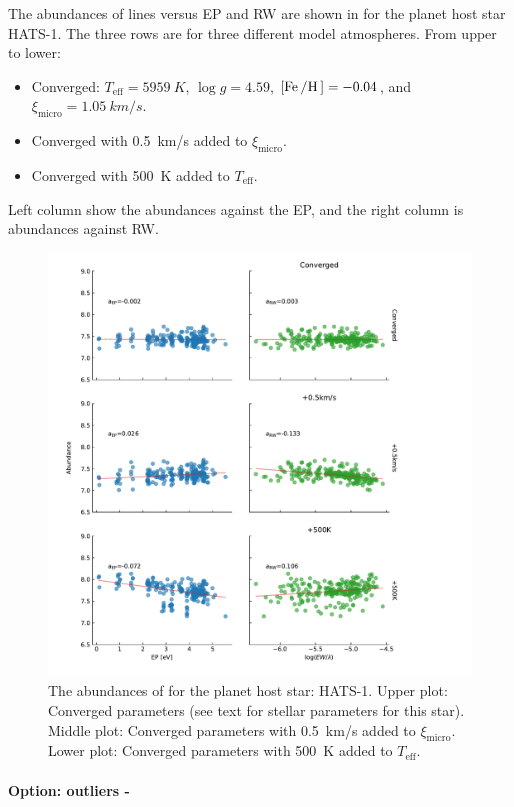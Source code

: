 The abundances of  lines versus EP and RW are shown in  for the planet
host star HATS-1. The three rows are for three different model atmospheres. From upper to lower:
\begin{itemize}
  \item Converged: $T_\mathrm{eff}=\SI{5959}{K}$,
                   $\log g=4.59$,
                   $[\ion{Fe}/\ion{H}]=-0.04$, and
                   $\xi_\mathrm{micro}=\SI{1.05}{km/s}$.
  \item Converged with \SI{0.5}{km/s} added to $\xi_\mathrm{micro}$.
  \item Converged with \SI{500}{K} added to $T_\mathrm{eff}$.
\end{itemize}
Left column show the abundances against the EP, and the right column is abundances against RW.

\begin{figure}[htpb!]
    \centering
    \includegraphics[width=0.85\linewidth]{figures/EP_RW_vs_abundance.pdf}
    \caption{The abundances of  for the planet host star: HATS-1.
             Upper plot: Converged parameters (see text for stellar parameters for this star).
             Middle plot: Converged parameters with \SI{0.5}{km/s} added to $\xi_\mathrm{micro}$.
             Lower plot: Converged parameters with \SI{500}{K} added to $T_\mathrm{eff}$.}
    \label{fig:eprw}
\end{figure}

\paragraph{Option: outliers - }

